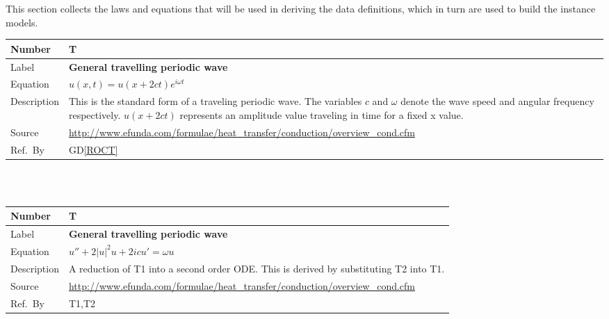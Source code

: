 \documentclass[12pt]{article}
\newcommand{\colAwidth}{0.13\textwidth}
\newcommand{\colBwidth}{0.82\textwidth}
\newcommand{\dref}[1]{GD\ref{#1}}
\newcounter{theorynum} %
\begin{document}
This section collects the laws and equations that will be used in deriving the
data definitions, which in turn are used to build the instance models.
 
~\newline
\noindent
\begin{minipage}{\textwidth}
	\renewcommand*{\arraystretch}{1.5}
	\begin{tabular}{| p{\colAwidth} | p{\colBwidth}|}
		\hline
		\rowcolor[gray]{0.9}
		Number& T{theorynum}\thetheorynum \label{T_COE}\\
		\hline
		Label&\bf General travelling periodic wave\\
		\hline
		Equation&  $ u(x,t)=u(x+2ct)e^{i\omega t}$\\
		\hline
		Description & 
		This is the standard form of a traveling periodic wave. The variables 
		$c$ and $\omega$ denote the wave speed and angular frequency 
		respectively. $u(x+2ct)$ represents an amplitude value traveling in 
		time for a fixed x value.\\
		\hline
		Source &
		\url{http://www.efunda.com/formulae/heat_transfer/conduction/overview_cond.cfm}\\
		\hline
		Ref.\ By & \dref{ROCT}\\
		\hline
	\end{tabular}
\end{minipage}\\

~\newline

\noindent
\begin{minipage}{\textwidth}
	\renewcommand*{\arraystretch}{1.5}
	\begin{tabular}{| p{\colAwidth} | p{\colBwidth}|}
		\hline
		\rowcolor[gray]{0.9}
		Number& T{theorynum}\thetheorynum \label{T_COE}\\
		\hline
		Label&\bf General travelling periodic wave\\
		\hline
		Equation&  $ u'' + 2|u|^{2}u+2icu'=\omega u$\\
		\hline
		Description & 
		A reduction of T1 into a second order ODE. This is derived by 
		substituting T2 into T1. \\
		\hline
		Source &
		\url{http://www.efunda.com/formulae/heat_transfer/conduction/overview_cond.cfm}\\
		\hline
		Ref.\ By & T1,T2\\
		\hline
	\end{tabular}
\end{minipage}\\
\end{document}
